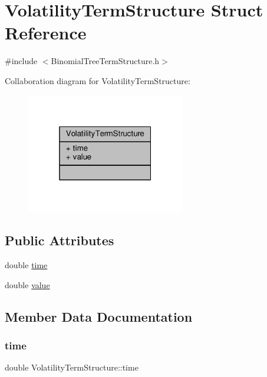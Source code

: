 \hypertarget{structVolatilityTermStructure}{}\section{Volatility\+Term\+Structure Struct Reference}
\label{structVolatilityTermStructure}


{\ttfamily \#include $<$Binomial\+Tree\+Term\+Structure.\+h$>$}



Collaboration diagram for Volatility\+Term\+Structure\+:
\nopagebreak
\begin{figure}[H]
\begin{center}
\leavevmode
\includegraphics[width=196pt]{structVolatilityTermStructure__coll__graph}
\end{center}
\end{figure}
\subsection*{Public Attributes}
\begin{DoxyCompactItemize}
\item 
double \hyperlink{structVolatilityTermStructure_aa151275d326dda7042829f3ea077124e}{time}
\item 
double \hyperlink{structVolatilityTermStructure_ab8eb66663708740d8de5f5904f3f462e}{value}
\end{DoxyCompactItemize}


\subsection{Member Data Documentation}
\hypertarget{structVolatilityTermStructure_aa151275d326dda7042829f3ea077124e}{}\label{structVolatilityTermStructure_aa151275d326dda7042829f3ea077124e} 
\subsubsection{\texorpdfstring{time}{time}}
{\footnotesize\ttfamily double Volatility\+Term\+Structure\+::time}

